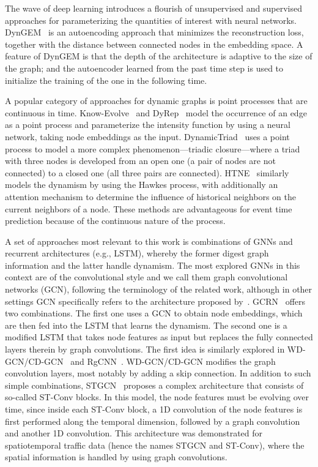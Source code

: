\documentclass[letterpaper]{article} %
\begin{document}
The wave of deep learning introduces a flourish of unsupervised and supervised approaches for parameterizing the quantities of interest with neural networks. DynGEM~\cite{Goyal2017} is an autoencoding approach that minimizes the reconstruction loss, together with the distance between connected nodes in the embedding space. A feature of DynGEM is that the depth of the architecture is adaptive to the size of the graph; and the autoencoder learned from the past time step is used to initialize the training of the one in the following time.

A popular category of approaches for dynamic graphs is point processes that are continuous in time. Know-Evolve~\cite{Trivedi2017} and DyRep~\cite{Trivedi2018} model the occurrence of an edge as a point process and parameterize the intensity function by using a neural network, taking node embeddings as the input. DynamicTriad~\cite{Zhou2018} uses a point process to model a more complex phenomenon---triadic closure---where a triad with three nodes is developed from an open one (a pair of nodes are not connected) to a closed one (all three pairs are connected). HTNE~\cite{Zuo2018} similarly models the dynamism by using the Hawkes process, with additionally an attention mechanism to determine the influence of historical neighbors on the current neighbors of a node. These methods are advantageous for event time prediction because of the continuous nature of the process.

A set of approaches most relevant to this work is combinations of GNNs and recurrent architectures (e.g., LSTM), whereby the former digest graph information and the latter handle dynamism. The most explored GNNs in this context are of the convolutional style and we call them graph convolutional networks (GCN), following the terminology of the related work, although in other settings GCN specifically refers to the architecture proposed by~\cite{Kipf2017}. GCRN~\cite{Seo2016} offers two combinations. The first one uses a GCN to obtain node embeddings, which are then fed into the LSTM that learns the dynamism. The second one is a modified LSTM that takes node features as input but replaces the fully connected layers therein by graph convolutions. The first idea is similarly explored in WD-GCN/CD-GCN~\cite{Manessia2017} and RgCNN~\cite{Narayan2018}. WD-GCN/CD-GCN modifies the graph convolution layers, most notably by adding a skip connection. In addition to such simple combinations, STGCN~\cite{Yu2018} proposes a complex architecture that consists of so-called ST-Conv blocks. In this model, the node features must be evolving over time, since inside each ST-Conv block, a 1D convolution of the node features is first performed along the temporal dimension, followed by a graph convolution and another 1D convolution. This architecture was demonstrated for spatiotemporal traffic data (hence the names STGCN and ST-Conv), where the spatial information is handled by using graph convolutions.
\end{document}
